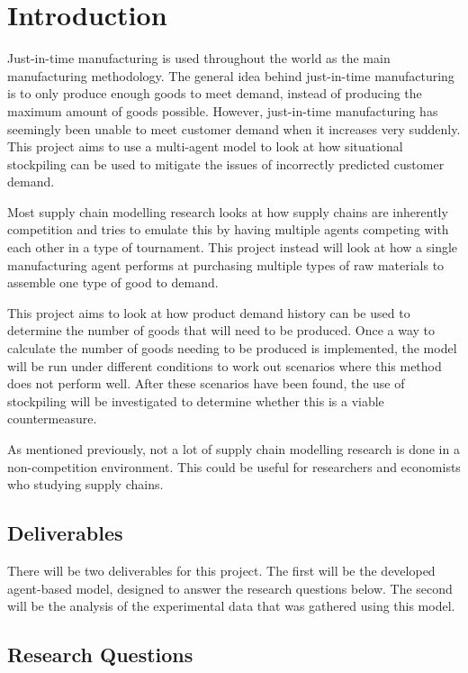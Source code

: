 \section{Introduction}

Just-in-time manufacturing is used throughout the world as the main manufacturing methodology.
The general idea behind just-in-time manufacturing is to only produce enough goods to meet demand, instead of producing the maximum amount of goods possible.
However, just-in-time manufacturing has seemingly been unable to meet customer demand when it increases very suddenly.
This project aims to use a multi-agent model to look at how situational stockpiling can be used to mitigate the issues of incorrectly predicted customer demand.

Most supply chain modelling research looks at how supply chains are inherently competition and tries to emulate this by having multiple agents competing with each other in a type of tournament.
This project instead will look at how a single manufacturing agent performs at purchasing multiple types of raw materials to assemble one type of good to demand.

This project aims to look at how product demand history can be used to determine the number of goods that will need to be produced.
Once a way to calculate the number of goods needing to be produced is implemented, the model will be run under different conditions to work out scenarios where this method does not perform well.
After these scenarios have been found, the use of stockpiling will be investigated to determine whether this is a viable countermeasure.

As mentioned previously, not a lot of supply chain modelling research is done in a non-competition environment.
This could be useful for researchers and economists who studying supply chains.

\subsection{Deliverables}

There will be two deliverables for this project.
The first will be the developed agent-based model, designed to answer the research questions below.
The second will be the analysis of the experimental data that was gathered using this model.

\subsection{Research Questions}\label{sec:research_questions}

